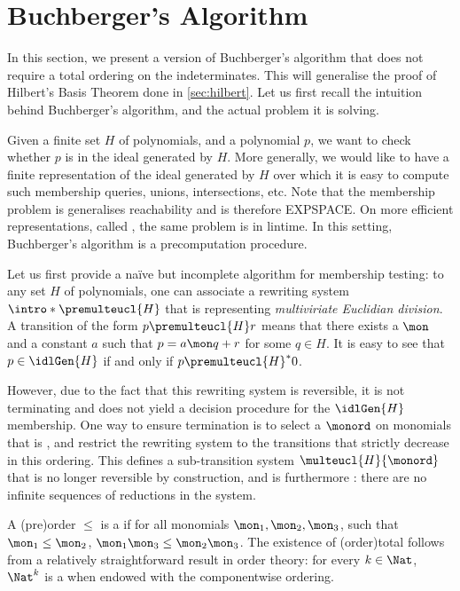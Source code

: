\section{Buchberger's Algorithm}
\label{sec:buchberger}

In this section, we present a version of Buchberger's algorithm that does not
require a total ordering on the indeterminates. This will generalise the proof
of Hilbert's Basis Theorem done in \cref{sec:hilbert}. Let us first recall the
intuition behind Buchberger's algorithm, and the actual problem it is solving.

Given a finite set $H$ of polynomials, and a polynomial $p$, we want to check
whether $p$ is in the ideal generated by $H$. More generally, we would like to
have a finite representation of the ideal generated by $H$ over which it is
easy to compute such membership queries, unions, intersections, etc. Note that
the membership problem is generalises reachability and is therefore EXPSPACE.
On more efficient representations, called , the same
problem is in lintime. In this setting, Buchberger's algorithm is a
precomputation procedure.

\AP Let us first provide a naïve but incomplete algorithm for membership
testing: to any set $H$ of polynomials, one can associate a rewriting system
$\intro*\premulteucl{H}$ that is representing \emph{multiviriate Euclidian
division}. A transition of the form $p \premulteucl{H} r$ means that there
exists a  $\mon$ and a constant $a$ such that $p = a \mon q + r$
for some $q \in H$. It is easy to see that $p \in \idlGen{H}$ if and only if $p
\premulteucl{H}^* 0$. 

\AP
However, due to the fact that this rewriting system is reversible, it is not
terminating and does not yield a decision procedure for the $\idlGen{H}$
membership. One way to ensure termination is to select a 
 $\monord$ on monomials that is , and restrict the rewriting system to the transitions that strictly
decrease in this ordering. This defines
a sub-transition system $\multeucl{H}{\monord}$ that is no longer reversible
by construction, and is furthermore : there are no
infinite sequences of reductions in the system.

\AP A (pre)order $\leq$ is a 
if for all monomials $\mon_1, \mon_2, \mon_3$, such that $\mon_1 \leq \mon_2$,
$\mon_1 \mon_3 \leq \mon_2 \mon_3$. The existence of 
\kl(order){total}  follows from a relatively
straightforward result in order theory: for every $k \in \Nat$, $\Nat^k$ is a
 when endowed with the componentwise ordering.


